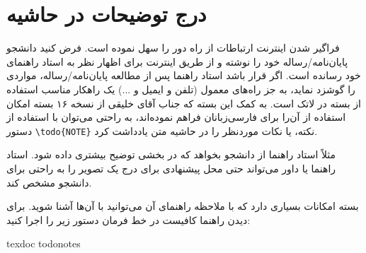 \section{درج توضیحات در حاشیه}
\setLTRparagraphfootnotes
فراگیر شدن اینترنت ارتباطات از راه دور را سهل نموده است. فرض کنید دانشجو \linebreak 
پایان‌نامه/رساله خود را نوشته و از طریق اینترنت برای اظهار نظر به استاد راهنمای خود رسانده است. 
اگر قرار باشد استاد راهنما پس از مطالعه پایان‌نامه/رساله، مواردی را  گوشزد نماید، به جز راه‌های معمول (تلفن و ایمیل و ...) یک راهکار مناسب استفاده از بسته 
در لاتک است. به کمک این بسته که جناب آقای خلیقی از نسخه ۱۶ بسته
امکان استفاده از آن‌را برای فارسی‌زبانان فراهم نموده‌اند، به راحتی می‌توان با استفاده از دستور
\verb!\todo{NOTE}!
نکته، یا نکات موردنظر  را در حاشیه متن یادداشت کرد.  

مثلاً استاد راهنما از دانشجو بخواهد که در بخشی توضیح بیشتری داده شود. استاد راهنما یا داور می‌تواند حتی محل پیشنهادی برای درج یک تصویر را به راحتی برای دانشجو مشخص کند.

بسته 
امکانات بسیاری دارد که با ملاحظه راهنمای آن می‌توانید با آن‌ها آشنا شوید. برای دیدن راهنما کافیست در خط فرمان دستور زیر را اجرا کنید:

\begin{latin}	
texdoc todonotes
\end{latin}	
